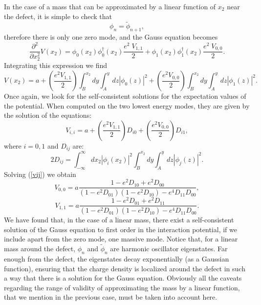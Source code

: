 \documentclass[a4paper,12pt]{article}
\begin{document}
{{In the case of a mass that can be approximated by a linear function of
$x_2$ near the defect, it is simple to check that~\cite{p1}
\begin{equation}
\phi_n=\widetilde{\phi}_{n+1},
\end{equation}
therefore there is only one zero mode, and the Gauss equation becomes
\begin{equation}
\frac{\partial^2}{\partial x_2^2}V(x_2)
=\phi_0(x_2)\phi^{\dagger}_0(x_2)\frac{e^2\;V_{1,1}}{2}+
\phi_1(x_2)\phi^{\dagger}_1(x_2)\frac{e^2\;V_{0,0}}{2}.
\end{equation}
Integrating this expression we find
\begin{equation}
V(x_2)=a+(\frac{e^2V_{1,1}}{2})\int_B^{x_2} dy \int_A^y dz
|\phi_0(z)|^2+(\frac{e^2V_{0,0}}{2})\int_B^{x_2} dy \int_A^y dz
|\phi_1(z)|^2.
\end{equation}
Once again, we look for the self-consistent solutions for the
expectation values of the potential. When computed on the two lowest
energy modes, they are given by the solution of the equations:
\begin{equation}
V_{i,i}=a+(\frac{e^2V_{1,1}}{2})D_{i0}+(\frac{e^2V_{0,0}}{2})D_{i1},
\label{vij}
\end{equation}
where $i=0,1$ and $D_{ij}$ are:
\begin{equation}
2D_{ij}=\int_{-\infty}^{\infty} dx_2 |\phi_i(x_2)|^2\int_B^{x_2} dy
\int_A^y dz |\phi_j(z)|^2.
\end{equation}
Solving (\ref{vij}) we obtain
\begin{equation}
V_{0,0}=a\frac{1-e^2D_{10}+e^2D_{00}}
{(1-e^2D_{01})(1-e^2D_{10})-e^4D_{11}D_{00}}, \nonumber
\end{equation}
\begin{equation}
V_{1,1}=a\frac{1-e^2D_{01}+e^2D_{11}}
{(1-e^2D_{01})(1-e^2D_{10})-e^4D_{11}D_{00}}.
\end{equation}
We have found that, in the case of a linear mass, there exist a
self-consistent solution of the Gauss equation to first order in the
interaction potential, if we include apart from the zero mode, one
massive mode.  Notice that, for a linear mass around the defect,
$\phi_n$ and $\widetilde{\phi}_n$ are harmonic oscillator eigenstates.
Far enough from the defect, the eigenstates decay exponentially (as a
Gaussian function), ensuring that the charge density is localized
around the defect in such a way that there is a solution for the Gauss
equation.  Obviously all the caveats regarding the range of validity
of approximating the mass by a linear function, that we mention in the
previous case, must be taken into account here.


}}
\end{document}
